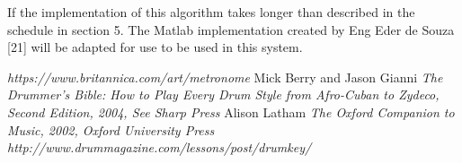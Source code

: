 \documentclass[a4paper, 11pt]{article}
\begin{document}
If the implementation of this algorithm takes longer than described in the schedule in   section 5. The Matlab implementation created by Eng Eder de Souza [21] will be adapted for use to be used in this system. 




\clearpage



\begin{thebibliography}{99}
\textit{https://www.britannica.com/art/metronome}
Mick Berry and Jason Gianni
\textit{The Drummer's Bible: How to Play Every Drum Style from Afro-Cuban to Zydeco, Second Edition, 2004, See Sharp Press}
Alison Latham
\textit{The Oxford Companion to Music, 2002, Oxford University Press}
\textit{http://www.drummagazine.com/lessons/post/drumkey/}

\end{thebibliography}
\end{document}
